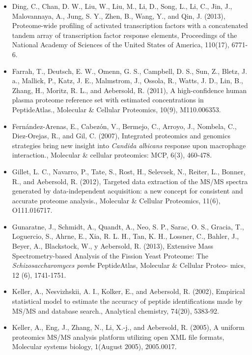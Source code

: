 \begin{itemize}[leftmargin=*]
\item[]{
Ding, C., Chan, D. W., Liu, W., Liu, M., Li, D., Song, L., Li, C., Jin, J., Malovannaya, A., Jung,
S. Y., Zhen, B., Wang, Y., and Qin, J. (2013), Proteome-wide profiling of activated 
transcription factors with a concatenated tandem array of transcription factor response elements,
Proceedings of the National Academy of Sciences of the United States of America, 110(17),
6771-6.
}

\item[]{
Farrah, T., Deutsch, E. W., Omenn, G. S., Campbell, D. S., Sun, Z., Bletz, J. a., Mallick, P., Katz,
J. E., Malmstrom, J., Ossola, R., Watts, J. D., Lin, B., Zhang, H., Moritz, R. L., 
and Aebersold, R. (2011), A high-confidence human plasma proteome reference set with estimated
concentrations in PeptideAtlas., Molecular \& Cellular Proteomics, 10(9), M110.006353.
}

\item[]{
Fern\'andez-Arenas, E., Cabez\'on, V., Bermejo, C., Arroyo, J., Nombela, C., Diez-Orejas, R.,
and Gil, C. (2007), Integrated proteomics and genomics strategies bring new insight into
\textit{Candida albicans} response upon macrophage interaction., 
Molecular \& cellular proteomics: MCP, 6(3), 460-478.
}

\item[]{
Gillet, L. C., Navarro, P., Tate, S., Rost, H., Selevsek, N., Reiter, L., Bonner, R., and Aebersold,
R. (2012), Targeted data extraction of the MS/MS spectra generated by data-independent
acquisition: a new concept for consistent and accurate proteome analysis., Molecular \&
Cellular Proteomics, 11(6), O111.016717.
}

\item[]{
Gunaratne, J., Schmidt, A., Quandt, A., Neo, S. P., Sarac, O. S., Gracia, T., Loguercio, S.,
Ahrne, E., Xia, R. L. H., Tan, K. H., Lossner, C., Bahler, J., Beyer, A., Blackstock, W., y
Aebersold, R. (2013), Extensive Mass Spectrometry-based Analysis of the Fission Yeast
Proteome: The \textit{Schizosaccharomyces pombe} PeptideAtlas, Molecular \& Cellular Proteo-
mics, 12 (6), 1741-1751.
}

\item[]{
Keller, A., Nesvizhskii, A. I., Kolker, E., and Aebersold, R. (2002), Empirical statistical model
to estimate the accuracy of peptide identifications made by MS/MS and database search.,
Analytical chemistry, 74(20), 5383-92.
}

\item[]{
Keller, A., Eng, J., Zhang, N., Li, X.-j., and Aebersold, R. (2005), A uniform proteomics MS/MS
analysis platform utilizing open XML file formats, Molecular systems biology, 1(August
2005), 2005.0017.
}


\end{itemize}

